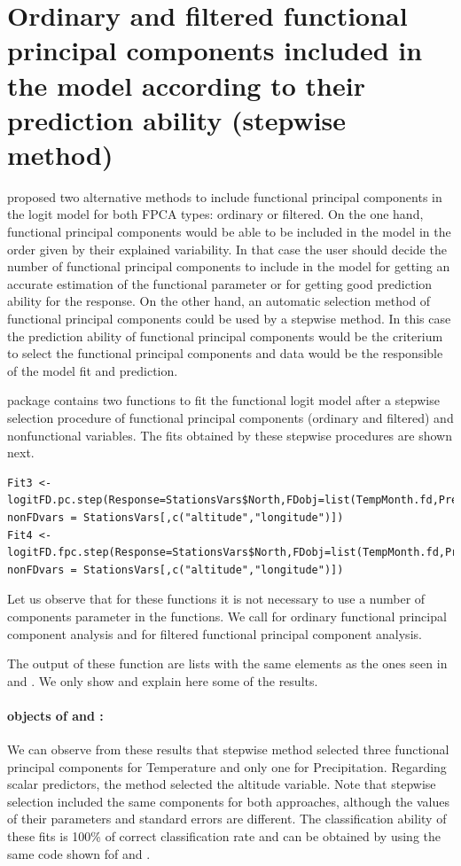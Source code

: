 \section{Ordinary and filtered functional principal components included in the model according to their prediction ability (stepwise method)}

\cite{Escabias04} proposed two alternative methods to include functional principal components in the logit model for both FPCA types: ordinary or filtered. On the one hand, functional principal components would be able to be included in the model in the order given by their explained variability. In that case the user should decide the number of functional principal components to include in the model for getting an accurate estimation of the functional parameter or for getting good prediction ability for the response. On the other hand, an automatic selection method of functional principal components could be used by a stepwise method. In this case the prediction ability of functional principal components would be the criterium to select the functional principal components and data would be the responsible of the model fit and prediction.

 package contains two functions to fit the functional logit model after a stepwise selection procedure of functional principal components (ordinary and filtered) and nonfunctional variables. The fits obtained by these stepwise procedures are shown next. 

\begin{verbatim}
Fit3 <- logitFD.pc.step(Response=StationsVars$North,FDobj=list(TempMonth.fd,PrecMonth.fd),
nonFDvars = StationsVars[,c("altitude","longitude")])
Fit4 <- logitFD.fpc.step(Response=StationsVars$North,FDobj=list(TempMonth.fd,PrecMonth.fd),
nonFDvars = StationsVars[,c("altitude","longitude")])
\end{verbatim}

Let us observe that for these functions it is not necessary to use a number of components parameter in the functions. We call  for ordinary functional principal component analysis and  for filtered functional principal component analysis. 

The output of these function are  lists with the same elements as the ones seen in  and . We only show and explain here some of the results.

\paragraph{ objects of  and :} We can observe from these results that stepwise method selected three functional principal components for Temperature and only one for Precipitation. Regarding scalar predictors, the method selected the altitude variable. Note that stepwise selection included the same components for both approaches, although the values of their parameters and standard errors are different. The classification ability of these fits is 100\% of correct classification rate and can be obtained by using the same code shown fof  and .

